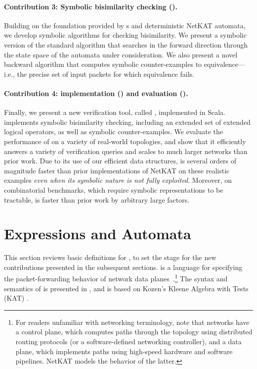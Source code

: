 \documentclass[acmsmall,dvipsnames,nonacm]{acmart}
\begin{document}
\paragraph{\textbf{Contribution 3: Symbolic bisimilarity checking} ().}
%
Building on the foundation provided by \SPPn{}s and deterministic
NetKAT automata, we develop symbolic algorithms for checking
bisimilarity. We present a symbolic version of the standard algorithm
that searches in the forward direction through the state space of the
automata under consideration. We also present a novel backward
algorithm that computes symbolic counter-examples to
equivalence---i.e., the precise set of input packets for which
equivalence fails.




\paragraph{\textbf{Contribution 4: \KATch implementation} () \textbf{and evaluation} ().}
%
Finally, we present a new verification tool, called \KATch,
implemented in Scala. \KATch{} implements symbolic bisimilarity
checking, including an extended set of extended logical operators, as
well as symbolic counter-examples.  We evaluate the performance of
\KATch{} on a variety of real-world topologies, and show that it
efficiently answers a variety of verification queries and scales to
much larger networks than prior work. Due to its use of our efficient
data structures, \KATch{} is several orders of magnitude faster than
prior implementations of NetKAT on these realistic examples \emph{even
when its symbolic nature is not fully exploited}. Moreover, on
combinatorial benchmarks, which require symbolic representations to be
tractable, \KATch{} is faster than prior work by arbitrary large
factors.

\section{\NetKAT Expressions and Automata}

This section reviews basic definitions for \NetKAT, to set the stage
for the new contributions presented in the subsequent sections.
\NetKAT is a language for specifying the packet-forwarding behavior of
network data
planes~\cite{Anderson2014,Foster2015,Smolka2015}.\footnote{For readers
unfamiliar with networking terminology, note that networks have a
control plane, which computes paths through the topology using
distributed routing protocols (or a software-defined networking
controller), and a data plane, which implements paths using high-speed
hardware and software pipelines. NetKAT models the behavior of the
latter.}  The syntax and semantics of \NetKAT is presented in
, and is based on Kozen's Kleene Algebra with Tests
(KAT) \cite{Kozen1996}.
\end{document}
